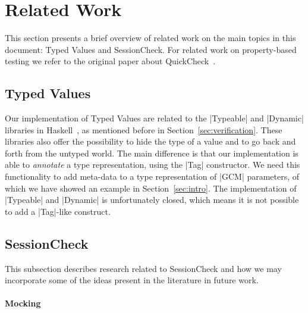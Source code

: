\documentclass{article}
\begin{document}
\section{Related Work}

This section presents a brief overview of related work on the main topics in this
document: Typed Values and SessionCheck. For related work on property-based
testing we refer to the original paper about QuickCheck~\cite{QuickCheck}.

\subsection{Typed Values}

Our implementation of Typed Values are related to the |Typeable| and |Dynamic|
libraries in Haskell~\cite{DataDynamic}, as mentioned before in
Section~\ref{sec:verification}. These libraries also offer the possibility to
hide the type of a value and to go back and forth from the untyped world. The
main difference is that our implementation is able to \emph{annotate} a type
representation, using the |Tag| constructor. We need this functionality to add
meta-data to a type representation of |GCM| parameters, of which we have showed an
example in Section~\ref{sec:intro}. The implementation of |Typeable| and
|Dynamic| is unfortunately closed, which means it is not possible to add a
|Tag|-like construct.


\subsection{SessionCheck}

This subsection describes research related to SessionCheck and how we
may incorporate some of the ideas present in the literature in future
work.

\paragraph{Mocking}
\end{document}
